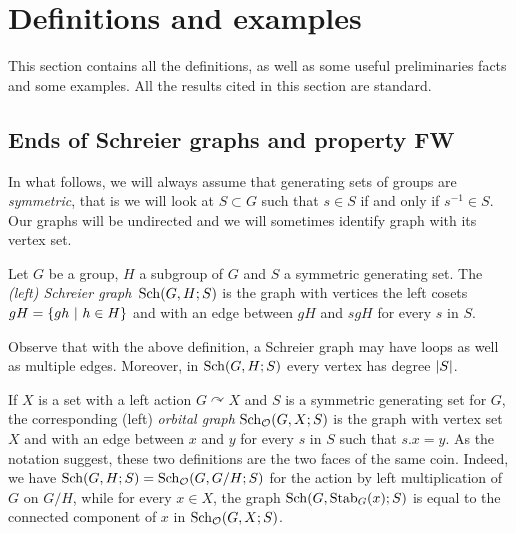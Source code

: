 %
%
%
%
%
%
%
%
%
%
\section{Definitions and examples}
This section contains all the definitions, as well as some useful preliminaries facts and some examples.
All the results cited in this section are standard.
%
%
%
%
%
%
%
%
%
%
\subsection{Ends of Schreier graphs and property FW}
\label{Subsection:FW}
%
%
%
%
%
In what follows, we will always assume that generating sets of groups are \emph{symmetric}, that is we will look at $S\subset G$ such that $s\in S$ if and only if $s^{-1}\in S$.
Our graphs will be undirected and we will sometimes identify  graph with its vertex set.
%
%
\begin{defn}
Let $G$ be a group, $H$ a subgroup of $G$ and $S$ a symmetric generating set. The \emph{(left) Schreier graph} $\operatorname{Sch}(G,H;S)$ is the graph with vertices the left cosets $gH=\{gh\ |\ h\in H\}$ and with an edge between $gH$ and $sgH$ for every $s$ in $S$.
\end{defn}
%
%
Observe that with the above definition, a Schreier graph may have loops as well as multiple edges. Moreover, in $\operatorname{Sch}(G,H;S)$ every vertex has degree $\lvert S\rvert$.

If $X$ is a set with a left action $G\curvearrowright X$ and $S$ is a symmetric generating set for $G$, the corresponding (left) \emph{orbital graph} $\operatorname{Sch}_{\mathcal O}(G,X;S)$ is the graph with vertex set $X$ and with an edge between $x$ and $y$ for every $s$ in $S$ such that $s.x=y$.
As the notation suggest, these two definitions are the two faces of the same coin. Indeed, we have $\operatorname{Sch}(G,H;S)=\operatorname{Sch}_{\mathcal O}(G,G/H;S)$ for the  action by left multiplication of $G$ on $G/H$, while   for every $x\in X$, the graph $\operatorname{Sch}(G,\operatorname{Stab}_G(x);S)$ is equal to the connected component of $x$ in $\operatorname{Sch}_{\mathcal O}(G,X;S)$.

